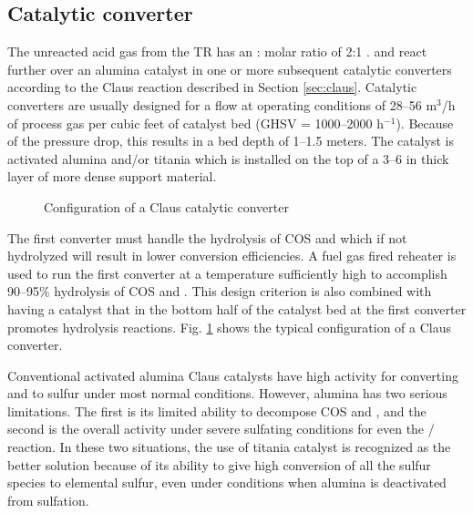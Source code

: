 %
%
%

\subsection{Catalytic converter}

The unreacted acid gas from the TR has an : molar ratio of 2:1 \citep{ZareNezhad2008738}.  and  react further over an alumina catalyst in one or more subsequent catalytic converters according to the Claus reaction described in Section \ref{sec:claus}. Catalytic converters are usually designed for a flow at operating conditions of 28--56 m$^\text{3}$/h of process gas per cubic feet of catalyst bed (GHSV = 1000--2000 h$^{-\text{1}}$). Because of the pressure drop, this results in a bed depth of 1--1.5 meters. The catalyst is activated alumina and/or titania which is installed on the top of a 3--6 in thick layer of more dense support material.


\begin{figure}[htbp]
\centering
{}
\caption{Configuration of a Claus catalytic converter \citep{ZareNezhad2009143}}
\label{fig:converter}
\end{figure}

The first converter must handle the hydrolysis of COS and  which if not hydrolyzed will result in lower conversion efficiencies. A fuel gas fired reheater is used to run the first converter at a temperature sufficiently high to accomplish 90--95\% hydrolysis of COS and . This design criterion is also combined with having a
 catalyst that in the bottom half of the catalyst bed at the first converter promotes hydrolysis reactions. Fig. \ref{fig:converter} shows the typical configuration of a Claus converter.

Conventional activated alumina Claus catalysts have high activity for converting  and  to sulfur under most normal conditions. However, alumina has two serious limitations. The first is its limited ability to decompose COS and , and the second is the overall activity under severe sulfating conditions for even the / reaction. In these two situations, the use of titania catalyst is recognized as the better solution because of its ability to give high conversion of all the sulfur species to elemental sulfur, even under conditions when alumina is deactivated from sulfation. 

